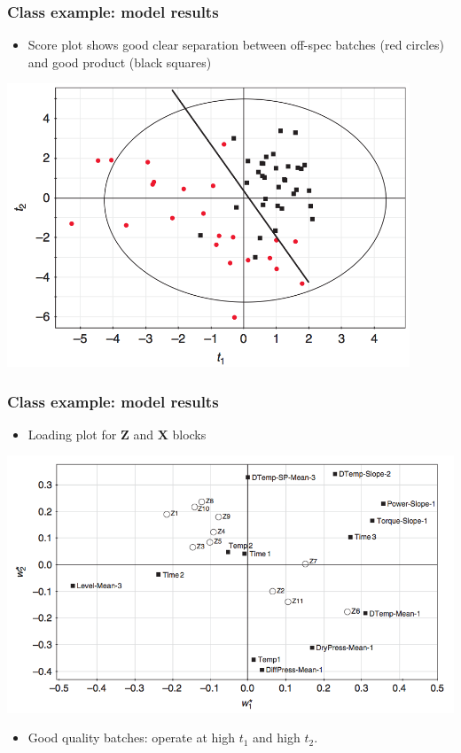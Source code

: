 \begin{frame}\frametitle{Class example: model results}
	
	\begin{itemize}
		\item	Score plot shows good clear separation between off-spec batches (red circles) and good product (black squares)
	\end{itemize}

	\begin{center}
		\includegraphics[width=0.9\textwidth]{images/fmc/fmc-score-plot-features.png}
	\end{center}
\end{frame}

\begin{frame}\frametitle{Class example: model results}
	
	\begin{itemize}
		\item	Loading plot for \( \mathbf{Z} \) and \( \mathbf{X} \) blocks
	\end{itemize}
	
	\begin{center}
		\includegraphics[width=\textwidth]{images/fmc/fmc-features-loading-plot.png}
	\end{center}
	
	\begin{itemize}
		\item	Good quality batches: operate at high \( t_1 \) and high \( t_2 \).
	\end{itemize}
	
\end{frame}

